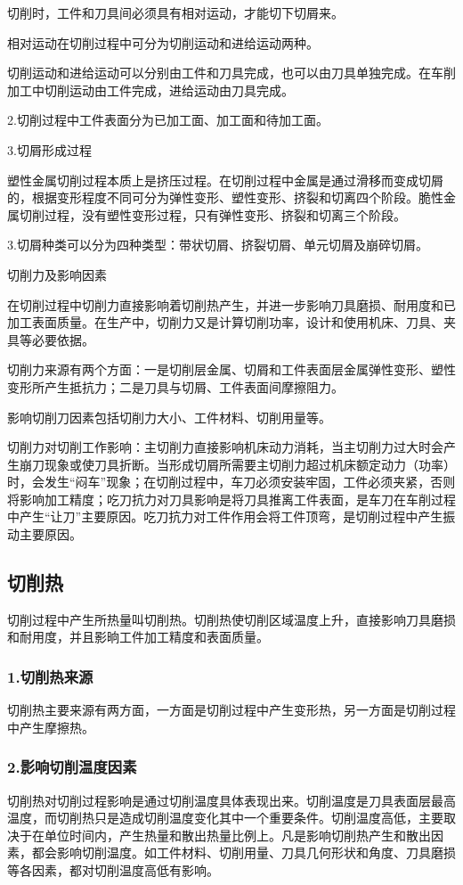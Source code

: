 \documentclass{ctexbook}
\begin{document}
切削时，工件和刀具间必须具有相对运动，才能切下切屑来。

相对运动在切削过程中可分为切削运动和进给运动两种。

切削运动和进给运动可以分别由工件和刀具完成，也可以由刀具单独完成。在车削加工中切削运动由工件完成，进给运动由刀具完成。

2.切削过程中工件表面分为已加工面、加工面和待加工面。

3.切屑形成过程

塑性金属切削过程本质上是挤压过程。在切削过程中金属是通过滑移而变成切屑的，根据变形程度不同可分为弹性变形、塑性变形、挤裂和切离四个阶段。脆性金属切削过程，没有塑性变形过程，只有弹性变形、挤裂和切离三个阶段。

3.切屑种类可以分为四种类型：带状切屑、挤裂切屑、单元切屑及崩碎切屑。

切削力及影响因素

在切削过程中切削力直接影响着切削热产生，并进一步影响刀具磨损、耐用度和已加工表面质量。在生产中，切削力又是计算切削功率，设计和使用机床、刀具、夹具等必要依据。

切削力来源有两个方面：一是切削层金属、切屑和工件表面层金属弹性变形、塑性变形所产生抵抗力；二是刀具与切屑、工件表面间摩擦阻力。

影响切削刀因素包括切削力大小、工件材料、切削用量等。

切削力对切削工作影响：主切削力直接影响机床动力消耗，当主切削力过大时会产生崩刀现象或使刀具折断。当形成切屑所需要主切削力超过机床额定动力（功率）时，会发生“闷车”现象；在切削过程中，车刀必须安装牢固，工件必须夹紧，否则将影响加工精度；吃刀抗力对刀具影响是将刀具推离工件表面，是车刀在车削过程中产生“让刀”主要原因。吃刀抗力对工件作用会将工件顶弯，是切削过程中产生振动主要原因。
\subsection{切削热}
切削过程中产生所热量叫切削热。切削热使切削区域温度上升，直接影响刀具磨损和耐用度，并且影晌工件加工精度和表面质量。
\subsubsection{1.切削热来源}
切削热主要来源有两方面，一方面是切削过程中产生变形热，另一方面是切削过程中产生摩擦热。
\subsubsection{2.影响切削温度因素}
切削热对切削过程影响是通过切削温度具体表现出来。切削温度是刀具表面层最高温度，而切削热只是造成切削温度变化其中一个重要条件。切削温度高低，主要取决于在单位时间内，产生热量和散出热量比例上。凡是影响切削热产生和散出因素，都会影响切削温度。如工件材料、切削用量、刀具几何形状和角度、刀具磨损等各因素，都对切削温度高低有影响。
\end{document}

